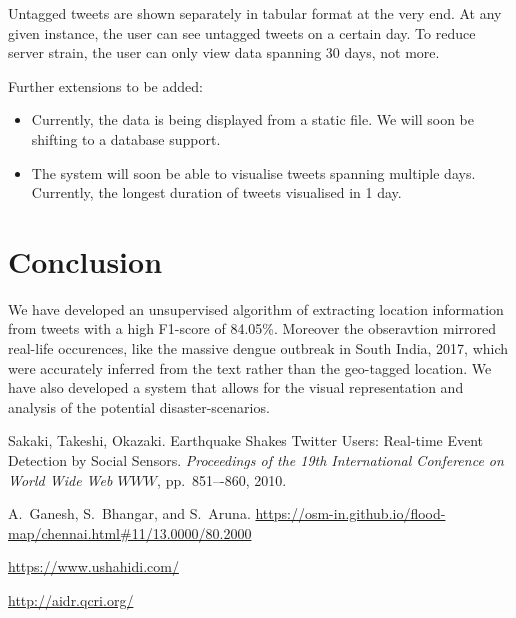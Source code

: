 \documentclass[journal, a4paper]{IEEEtran}
\begin{document}
Untagged tweets are shown separately in tabular format at the very end. At any given instance, the user can see untagged tweets on a certain day. To reduce server strain, the user can only view data spanning 30 days, not more.

Further extensions to be added:
\begin{itemize}
	\item Currently, the data is being displayed from a static file. We will soon be shifting to a database support.
	\item The system will soon be able to visualise tweets spanning multiple days. Currently, the longest duration of tweets visualised in 1 day.
\end{itemize}




\section{Conclusion}
	We have developed an unsupervised algorithm of extracting location information from tweets with a high F1-score of 84.05\%. Moreover the obseravtion mirrored real-life occurences, like the massive dengue outbreak in South India, 2017, which were accurately inferred from the text rather than the geo-tagged location. We have also developed a system that allows for the visual representation and analysis of the potential disaster-scenarios. 

\begin{thebibliography}{5}

	Sakaki, Takeshi, Okazaki.
	Earthquake Shakes Twitter Users: Real-time Event Detection by Social Sensors. {\em Proceedings of the 19th International Conference on World Wide Web \(WWW\)},  pp.~851–-860, 2010.
	
	
	A.~Ganesh, S.~Bhangar, and S.~Aruna.
	\url{https://osm-in.github.io/flood-map/chennai.html#11/13.0000/80.2000}
	
	\url{https://www.ushahidi.com/}
	
	\url{http://aidr.qcri.org/}



\end{thebibliography}

\end{document}
